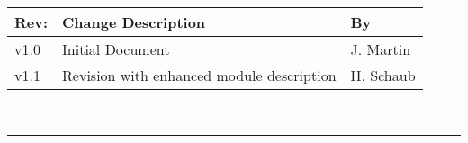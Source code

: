 \documentclass[]{BasiliskReportMemo}
\begin{document}
	
	\makeCover

%
%
\pagestyle{empty}
{\renewcommand{\arraystretch}{1.1}
\noindent
\begin{longtable}{|p{0.5in}|p{4.5in}|p{1.14in}|}
\hline
{\bfseries Rev}: & {\bfseries Change Description} & {\bfseries By} \\
\hline
v1.0 & Initial Document & J. Martin \\ \hline
v1.1 & Revision with enhanced module description & H. Schaub \\ \hline
\hline

\end{longtable}
}

\newpage
\setcounter{page}{1}
\pagestyle{fancy}

\tableofcontents
~\\ \hrule ~\\





\end{document}
